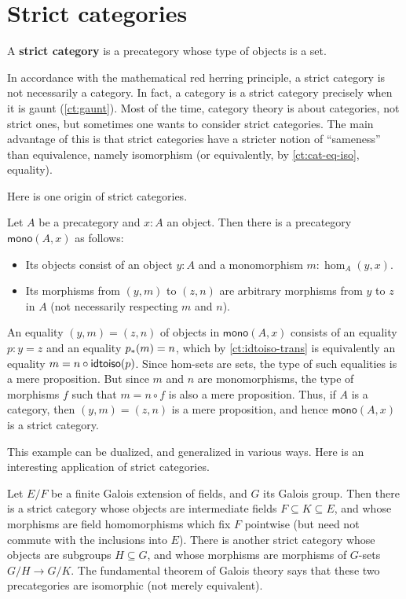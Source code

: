 \section{Strict categories}
\label{sec:strict-categories}

\begin{defn}
  A \textbf{strict category} is a precategory whose type of objects is a set.
\end{defn}

In accordance with the mathematical red herring principle, a strict category is not necessarily a category.
In fact, a category is a strict category precisely when it is gaunt (\autoref{ct:gaunt}).
Most of the time, category theory is about categories, not strict ones, but sometimes one wants to consider strict categories.
The main advantage of this is that strict categories have a stricter notion of ``sameness'' than equivalence, namely isomorphism (or equivalently, by \autoref{ct:cat-eq-iso}, equality).

Here is one origin of strict categories.

\begin{eg}
  Let $A$ be a precategory and $x:A$ an object.
  Then there is a precategory $\mathsf{mono}(A,x)$ as follows:
  \begin{itemize}
  \item Its objects consist of an object $y:A$ and a monomorphism $m:\hom_A(y,x)$.
  \item Its morphisms from $(y,m)$ to $(z,n)$ are arbitrary morphisms from $y$ to $z$ in $A$ (not necessarily respecting $m$ and $n$).
  \end{itemize}
  An equality $(y,m)=(z,n)$ of objects in $\mathsf{mono}(A,x)$ consists of an equality $p:y=z$ and an equality ${p}_{*}\!\left({m}\right)=n$, which by \autoref{ct:idtoiso-trans} is equivalently an equality $m=n\circ \mathsf{idtoiso}(p)$.
  Since hom-sets are sets, the type of such equalities is a mere proposition.
  But since $m$ and $n$ are monomorphisms, the type of morphisms $f$ such that $m = n\circ f$ is also a mere proposition.
  Thus, if $A$ is a category, then $(y,m)=(z,n)$ is a mere proposition, and hence $\mathsf{mono}(A,x)$ is a strict category.
\end{eg}

This example can be dualized, and generalized in various ways.
Here is an interesting application of strict categories.

\begin{eg}\label{ct:galois}
  Let $E/F$ be a finite Galois extension of fields, and $G$ its Galois group.
  Then there is a strict category whose objects are intermediate fields $F\subseteq K\subseteq E$, and whose morphisms are field homomorphisms which fix $F$ pointwise (but need not commute with the inclusions into $E$).
  There is another strict category whose objects are subgroups $H\subseteq G$, and whose morphisms are morphisms of $G$-sets $G/H \to G/K$.
  The fundamental theorem of Galois theory says that these two precategories are isomorphic (not merely equivalent).
\end{eg}


